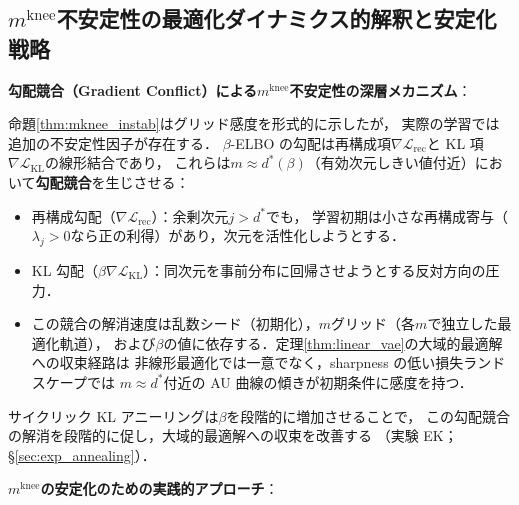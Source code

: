 \documentclass[11pt,a4paper]{jsarticle}
\newcommand{\mknee}{m^{\mathrm{knee}}}
\begin{document}
\subsection{$\mknee$不安定性の最適化ダイナミクス的解釈と安定化戦略}\label{sec:disc_mknee_improve}

\textbf{勾配競合（Gradient Conflict）による$\mknee$不安定性の深層メカニズム}：

命題\ref{thm:mknee_instab}はグリッド感度を形式的に示したが，
実際の学習では追加の不安定性因子が存在する．
$\beta$-ELBO の勾配は再構成項$\nabla\mathcal{L}_\mathrm{rec}$と
KL 項$\nabla\mathcal{L}_\mathrm{KL}$の線形結合であり，
これらは$m \approx d^*(\beta)$（有効次元しきい値付近）において\textbf{勾配競合}を生じさせる：

\begin{itemize}
  \item 再構成勾配（$\nabla\mathcal{L}_\mathrm{rec}$）：余剰次元$j > d^*$でも，
        学習初期は小さな再構成寄与（$\lambda_j > 0$なら正の利得）があり，次元を活性化しようとする．
  \item KL 勾配（$\beta\nabla\mathcal{L}_\mathrm{KL}$）：同次元を事前分布に回帰させようとする反対方向の圧力．
  \item この競合の解消速度は乱数シード（初期化），$m$グリッド（各$m$で独立した最適化軌道），
        および$\beta$の値に依存する．定理\ref{thm:linear_vae}の大域的最適解への収束経路は
        非線形最適化では一意でなく，sharpness の低い損失ランドスケープでは
        $m \approx d^*$付近の AU 曲線の傾きが初期条件に感度を持つ．
\end{itemize}

サイクリック KL アニーリング\cite{fu2019cyclical}は$\beta$を段階的に増加させることで，
この勾配競合の解消を段階的に促し，大域的最適解への収束を改善する
（実験 EK；§\ref{sec:exp_annealing}）．

\textbf{$\mknee$の安定化のための実践的アプローチ}：
\end{document}
